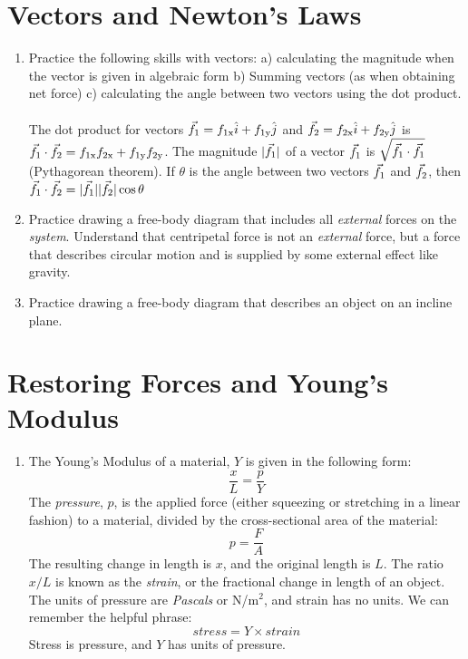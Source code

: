 \documentclass[10pt]{article}
\begin{document}
\maketitle

\section{Vectors and Newton's Laws}
\begin{enumerate}
\item Practice the following skills with vectors: a) calculating the magnitude when the vector is given in algebraic form b) Summing vectors (as when obtaining net force) c) calculating the angle between two vectors using the dot product. \\ \\
The dot product for vectors $\vec{f}_{\rm 1} = f_{\rm 1x}\hat{i} + f_{\rm 1y}\hat{j}$ and $\vec{f}_{\rm 2} = f_{\rm 2x}\hat{i} + f_{\rm 2y}\hat{j}$ is $\vec{f}_{\rm 1} \cdot \vec{f}_{\rm 2} = f_{\rm 1x}f_{\rm 2x} + f_{\rm 1y}f_{\rm 2y}$.  The magnitude $|\vec{f}_{\rm 1}|$ of a vector $\vec{f}_{\rm 1}$ is $\sqrt{\vec{f}_{\rm 1}\cdot\vec{f}_{\rm 1}}$ (Pythagorean theorem).  If $\theta$ is the angle between two vectors $\vec{f}_{\rm 1}$ and $\vec{f}_{\rm 2}$, then $\vec{f}_{\rm 1} \cdot \vec{f}_{\rm 2} = |\vec{f}_{\rm 1}||\vec{f}_{\rm 2}|\cos\theta$
\item Practice drawing a free-body diagram that includes all \textit{external} forces on the \textit{system}.  Understand that centripetal force is not an \textit{external} force, but a force that describes circular motion and is supplied by some external effect like gravity.
\item Practice drawing a free-body diagram that describes an object on an incline plane.
\end{enumerate}
\section{Restoring Forces and Young's Modulus}
\begin{enumerate}
\item The Young's Modulus of a material, $Y$ is given in the following form: \\
\begin{equation}
\frac{x}{L} = \frac{p}{Y}
\end{equation}
The \textit{pressure}, $p$, is the applied force (either squeezing or stretching in a linear fashion) to a material, divided by the cross-sectional area of the material:
\begin{equation}
p = \frac{F}{A}
\end{equation}
The resulting change in length is $x$, and the original length is $L$.  The ratio $x/L$ is known as the \textit{strain}, or the fractional change in length of an object.  The units of pressure are \textit{Pascals} or N/m$^2$, and strain has no units.  We can remember the helpful phrase:
\begin{equation}
stress = Y \times strain
\end{equation}
Stress is pressure, and $Y$ has units of pressure.
\end{enumerate}
\end{document}
